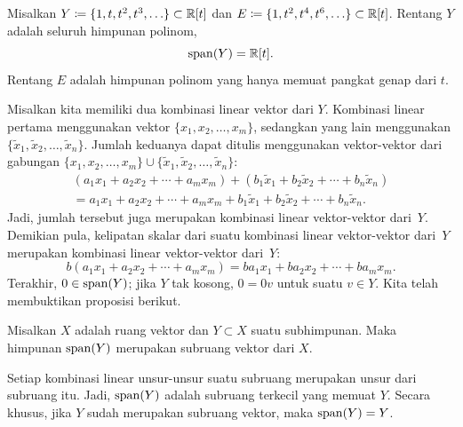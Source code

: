 \begin{example}
Misalkan $Y \coloneqq \{ 1, t, t^2, t^3, \ldots \} \subset {\mathbb{R}}[t]$ dan
$E \coloneqq \{ 1, t^2, t^4, t^6, \ldots \} \subset {\mathbb{R}}[t]$.
Rentang $Y$ adalah seluruh himpunan polinom,
\begin{equation*}
\operatorname{span}(Y) = {\mathbb{R}}[t] .
\end{equation*}
Rentang $E$ adalah himpunan polinom yang hanya memuat pangkat genap dari $t$.
\end{example}

Misalkan kita memiliki dua kombinasi linear vektor dari $Y$.  Kombinasi linear
pertama menggunakan vektor $\{ x_1,x_2,\ldots,x_m \}$, sedangkan yang lain menggunakan
$\{ \widetilde{x}_1,\widetilde{x}_2,\ldots,\widetilde{x}_n \}$.  Jumlah keduanya dapat ditulis
menggunakan vektor-vektor dari gabungan
$\{ x_1,x_2,\ldots,x_m \} \cup
\{ \widetilde{x}_1,\widetilde{x}_2,\ldots,\widetilde{x}_n \}$:
\begin{multline*}
(a_1 x_1 + 
a_2 x_2 +  \cdots
+ a_m x_m)
+
(b_1 \widetilde{x}_1 + 
b_2 \widetilde{x}_2 +  \cdots
+ b_n \widetilde{x}_n)
\\
=
a_1 x_1 + 
a_2 x_2 +  \cdots
+ a_m x_m
+
b_1 \widetilde{x}_1 + 
b_2 \widetilde{x}_2 +  \cdots
+ b_n \widetilde{x}_n .
\end{multline*}
Jadi, jumlah tersebut juga merupakan kombinasi linear vektor-vektor dari~$Y$.
Demikian pula,
kelipatan skalar dari suatu kombinasi linear vektor-vektor dari~$Y$
merupakan kombinasi linear vektor-vektor dari~$Y$:
\begin{equation*}
b (a_1 x_1 + 
a_2 x_2 +  \cdots
+ a_m x_m)
=
b a_1  x_1 + 
b a_2 x_2 +  \cdots
+ b a_m x_m .
\end{equation*}
Terakhir, $0 \in \operatorname{span}(Y)$; jika $Y$ tak kosong, $0 = 0 v$ untuk suatu $v \in Y$.
Kita telah membuktikan proposisi berikut.

\begin{prop}
Misalkan $X$ adalah ruang vektor dan $Y \subset X$ suatu subhimpunan.
Maka himpunan $\operatorname{span}(Y)$ merupakan subruang vektor dari $X$.
\end{prop}

Setiap kombinasi linear unsur-unsur suatu subruang merupakan unsur dari
subruang itu.  Jadi, $\operatorname{span}(Y)$ adalah subruang terkecil yang memuat $Y$.
Secara khusus,
jika $Y$ sudah merupakan subruang vektor, maka $\operatorname{span}(Y) = Y$.

